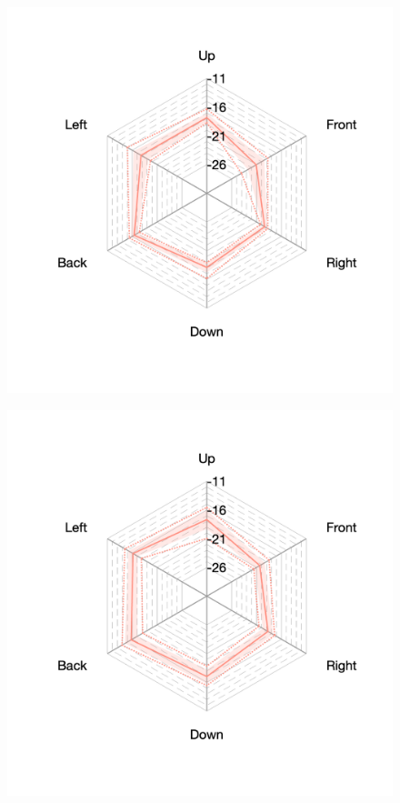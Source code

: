 \documentclass[11pt,a4j]{jreport}
\begin{document}
\begin{figure}[H]
      \begin{minipage}[b]{.33\textwidth}
        \centering
        \includegraphics[width=1\linewidth]{images/realHallDirSt/early_S07_allhall.png}
        \label{fig:S07early}
      \end{minipage}%
      \begin{minipage}[b]{.33\textwidth}
        \centering
        \includegraphics[width=1\linewidth]{images/realHallDirSt/early_S06_allhall.png}

\end{minipage}
\end{figure}
\end{document}
